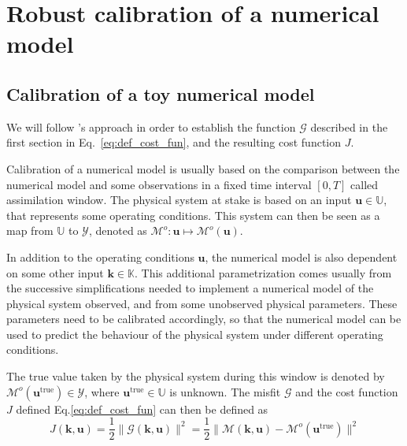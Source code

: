 \documentclass[preprint, 1p]{elsarticle}
\newcommand{\Kspace}{\mathbb{K}}
\newcommand{\Uspace}{\mathbb{U}}
\begin{document}
\clearpage

\section{Robust calibration of a numerical model}
\label{sec:SWE_application}

\subsection{Calibration of a toy numerical model}
 We will follow \citeauthor{kennedy_bayesian_2001}'s approach in order to establish the function $\mathcal{G}$ described in the first section in Eq.~\eqref{eq:def_cost_fun}, and the resulting cost function $J$.
 
 Calibration of a numerical model is usually based on the comparison between the numerical model and some observations in a fixed time interval $[0, T]$ called assimilation window.
The physical system at stake is based on an input $\mathbf{u} \in \Uspace$, that represents some operating conditions. This system can then be seen as a map from $\Uspace$ to $\mathcal{Y}$, denoted as $\mathcal{M}^o : \mathbf{u}\mapsto \mathcal{M}^o(\mathbf{u})$. 

In addition to the operating conditions $\mathbf{u}$, the numerical model is also dependent on some other input $\mathbf{k}\in\Kspace$. This additional parametrization comes usually from the successive simplifications needed to implement a numerical model of the physical system observed, and from some unobserved physical parameters. These parameters need to be calibrated accordingly, so that the numerical model can be used to predict the behaviour of the physical system under different operating conditions.

The true value taken by the physical system during this window is denoted by $\mathcal{M}^o(\mathbf{u}^{\mathrm{true}}) \in \mathcal{Y}$, where $\mathbf{u}^{\mathrm{true}} \in \Uspace$ is unknown. The misfit $\mathcal{G}$ and the cost function $J$ defined Eq.\eqref{eq:def_cost_fun} can then be defined as
\begin{equation}
J(\mathbf{k},\mathbf{u}) = \frac12 \| \mathcal{G}(\mathbf{k},\mathbf{u}) \|^2 = \frac12 \|\mathcal{M}(\mathbf{k},\mathbf{u}) - \mathcal{M}^{o}(\mathbf{u}^{\mathrm{true}}) \|^2
\end{equation}
\end{document}

